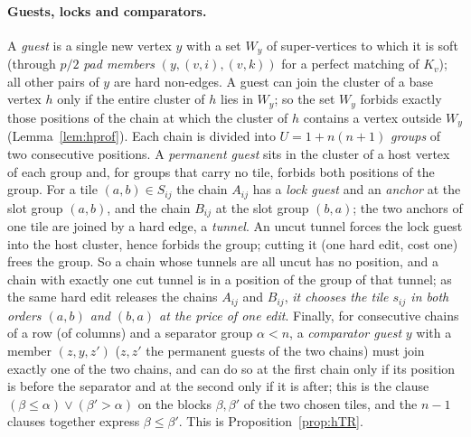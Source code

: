 \paragraph{Guests, locks and comparators.} A \emph{guest} is a single new vertex $y$ with a set $W_y$ of super-vertices to which it is soft (through $p/2$ \emph{pad members} $(y,(v,i),(v,k))$ for a perfect matching of $K_v$); all other pairs of $y$ are hard non-edges. A guest can join the cluster of a base vertex $h$ only if the entire cluster of $h$ lies in $W_y$; so the set $W_y$ forbids exactly those positions of the chain at which the cluster of $h$ contains a vertex outside $W_y$ (Lemma~\ref{lem:hprof}). Each chain is divided into $U=1+n(n+1)$ \emph{groups} of two consecutive positions. A \emph{permanent guest} sits in the cluster of a host vertex of each group and, for groups that carry no tile, forbids both positions of the group. For a tile $(a,b)\in S_{ij}$ the chain $A_{ij}$ has a \emph{lock guest} and an \emph{anchor} at the slot group $(a,b)$, and the chain $B_{ij}$ at the slot group $(b,a)$; the two anchors of one tile are joined by a hard edge, a \emph{tunnel}. An uncut tunnel forces the lock guest into the host cluster, hence forbids the group; cutting it (one hard edit, cost one) frees the group. So a chain whose tunnels are all uncut has no position, and a chain with exactly one cut tunnel is in a position of the group of that tunnel; as the same hard edit releases the chains $A_{ij}$ and $B_{ij}$, \emph{it chooses the tile $s_{ij}$ in both orders $(a,b)$ and $(b,a)$ at the price of one edit}. Finally, for consecutive chains of a row (of columns) and a separator group $\alpha<n$, a \emph{comparator guest} $y$ with a member $(z,y,z')$ ($z,z'$ the permanent guests of the two chains) must join exactly one of the two chains, and can do so at the first chain only if its position is before the separator and at the second only if it is after; this is the clause $(\beta\le\alpha)\vee(\beta'>\alpha)$ on the blocks $\beta,\beta'$ of the two chosen tiles, and the $n-1$ clauses together express $\beta\le\beta'$. This is Proposition~\ref{prop:hTR}.

